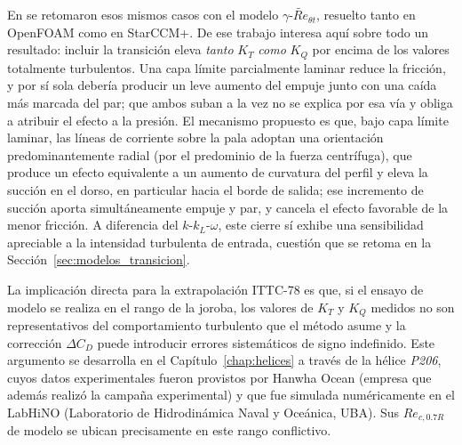 En \citet{gaggero2021transition} se retomaron esos mismos casos con el modelo $\gamma$-$\widetilde{Re}_{\theta t}$, resuelto tanto en OpenFOAM como en StarCCM+. De ese trabajo interesa aquí sobre todo un resultado: incluir la transición eleva \emph{tanto} $K_T$ \emph{como} $K_Q$ por encima de los valores totalmente turbulentos. Una capa límite parcialmente laminar reduce la fricción, y por sí sola debería producir un leve aumento del empuje junto con una caída más marcada del par; que ambos suban a la vez no se explica por esa vía y obliga a atribuir el efecto a la presión. El mecanismo propuesto es que, bajo capa límite laminar, las líneas de corriente sobre la pala adoptan una orientación predominantemente radial (por el predominio de la fuerza centrífuga), que produce un efecto equivalente a un aumento de curvatura del perfil y eleva la succión en el dorso, en particular hacia el borde de salida; ese incremento de succión aporta simultáneamente empuje y par, y cancela el efecto favorable de la menor fricción. A diferencia del $k$-$k_L$-$\omega$, este cierre sí exhibe una sensibilidad apreciable a la intensidad turbulenta de entrada, cuestión que se retoma en la Sección~\ref{sec:modelos_transicion}.
 
La implicación directa para la extrapolación ITTC-78 es que, si el ensayo de modelo se realiza en el rango de la joroba, los valores de $K_T$ y $K_Q$ medidos no son representativos del comportamiento turbulento que el método asume y la corrección $\Delta C_D$ puede introducir errores sistemáticos de signo indefinido. Este argumento se desarrolla en el Capítulo~\ref{chap:helices} a través de la hélice \textit{P206}, cuyos datos experimentales fueron provistos por Hanwha Ocean (empresa que además realizó la campaña experimental)
y que fue simulada numéricamente en el LabHiNO (Laboratorio de Hidrodinámica Naval y Oceánica, UBA). Sus $Re_{c,0.7R}$ de modelo se ubican precisamente en este rango conflictivo.
 
